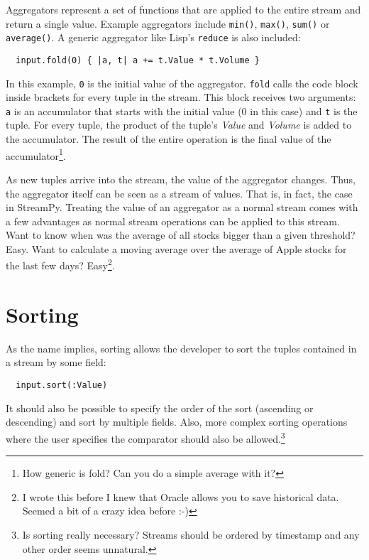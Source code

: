 \documentclass[twoside]{report}
\begin{document}
Aggregators represent a set of functions that are applied to the entire stream and return a single value. Example aggregators include \verb=min()=, \verb=max()=, \verb=sum()= or \verb=average()=. A generic aggregator like Lisp's \verb=reduce= is also included:

\begin{verbatim}
  input.fold(0) { |a, t| a += t.Value * t.Volume }
\end{verbatim}

In this example, \verb=0= is the initial value of the aggregator. \verb=fold= calls the code block inside brackets for every tuple in the stream. This block receives two arguments: \verb=a= is an accumulator that starts with the initial value (0 in this case) and \verb=t= is the tuple. For every tuple, the product of the tuple's \emph{Value} and \emph{Volume} is added to the accumulator. The result of the entire operation is the final value of the accumulator\footnote{How generic is fold? Can you do a simple average with it?}.

As new tuples arrive into the stream, the value of the aggregator changes. Thus, the aggregator itself can be seen as a stream of values. That is, in fact, the case in StreamPy. Treating the value of an aggregator as a normal stream comes with a few advantages as normal stream operations can be applied to this stream. Want to know when was the average of all stocks bigger than a given threshold? Easy. Want to calculate a moving average over the average of Apple stocks for the last few days? Easy\footnote{I wrote this before I knew that Oracle allows you to save historical data. Seemed a bit of a crazy idea before :-)}.

\section{Sorting}

As the name implies, sorting allows the developer to sort the tuples contained in a stream by some field:

\begin{verbatim}
  input.sort(:Value)
\end{verbatim}

It should also be possible to specify the order of the sort (ascending or descending) and sort by multiple fields. Also, more complex sorting operations where the user specifies the comparator should also be allowed.\footnote{Is sorting really necessary? Streams should be ordered by timestamp and any other order seems unnatural.}
\end{document}
